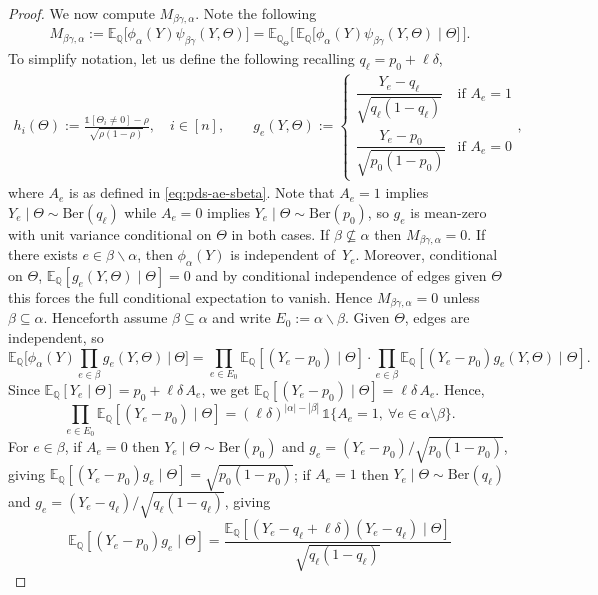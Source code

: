 \documentclass[10pt,a4paper]{amsart}
\newcommand{\E}{\mathbb{E}}
\newcommand{\QQ}{\mathbb{Q}}
\begin{document}
\begin{proof}
\noindent We now compute $M_{\beta\gamma,\alpha}$.
Note the following \begin{align*}
    M_{\beta\gamma,\alpha}
:= \E_{\mathbb Q}\big[\phi_\alpha(Y)\psi_{\beta\gamma}(Y,\Theta)\big]
= \E_{\QQ_\Theta}\Big[\,\E_\QQ\big[\phi_\alpha(Y)\psi_{\beta\gamma}(Y,\Theta)\mid\Theta\big]\,\Big].
\end{align*}
%
To simplify notation, let us define the following recalling $q_\ell=p_0+\ell\delta$, 
\begin{align*}
    h_i(\Theta) := \frac{\mathds 1[\Theta_i\neq 0]-\rho}{\sqrt{\rho(1-\rho)}}, \quad i \in [n], \qquad
    g_e(Y,\Theta):=
\begin{cases}
\dfrac{Y_e-q_\ell}{\sqrt{q_\ell(1-q_\ell)}} & \text{if }A_e=1\\[0.8em]
\dfrac{Y_e-p_0}{\sqrt{p_0(1-p_0)}} & \text{if }A_e=0
\end{cases},
\end{align*}
where $A_e$ is as defined in \eqref{eq:pds-ae-sbeta}. Note that $A_e=1$ implies $Y_e\mid\Theta\sim\mathrm{Ber}(q_\ell)$
while $A_e=0$ implies $Y_e\mid\Theta\sim\mathrm{Ber}(p_0)$,
so $g_e$ is mean-zero with unit variance conditional on $\Theta$ in both cases.
If $\beta\not\subseteq\alpha$ then $M_{\beta\gamma,\alpha}=0$.
If there exists $e\in\beta\backslash\alpha$, then $\phi_\alpha(Y)$ is independent of~$Y_e$.
Moreover, conditional on $\Theta$,
$
\E_{\QQ}[g_e(Y,\Theta)\mid\Theta]=0
$
and by conditional independence
of edges given $\Theta$ this forces the full conditional expectation to vanish. Hence
$M_{\beta\gamma,\alpha}=0$ unless $\beta\subseteq\alpha$. Henceforth assume $\beta\subseteq\alpha$ and write $E_0:=\alpha\backslash\beta$.
\medskip
\noindent Given $\Theta$, edges are independent, so
\[
\E_{\QQ}\Big[\phi_\alpha(Y)\prod_{e\in\beta}g_e(Y,\Theta)\ \Big|\ \Theta\Big]
=
\prod_{e\in E_0}\E_{\QQ}[(Y_e-p_0)\mid\Theta]\cdot
\prod_{e\in \beta}\E_{\QQ}[(Y_e-p_0)g_e(Y,\Theta)\mid\Theta].
\]
Since $\E_{\QQ}[Y_e\mid\Theta]=p_0+\ell\delta\, A_e$, we get $\E_{\QQ}[(Y_e-p_0)\mid\Theta]=\ell\delta\, A_e$. Hence,
\[
\prod_{e\in E_0}\E_{\QQ}[(Y_e-p_0)\mid\Theta]
=(\ell\delta)^{|\alpha|-|\beta|}\,\mathds 1\{A_e=1,\ \forall e\in\alpha\setminus\beta\}.
\]
For $e\in\beta$, if $A_e=0$ then $Y_e\mid\Theta\sim\mathrm{Ber}(p_0)$ and
$g_e=(Y_e-p_0)/\sqrt{p_0(1-p_0)}$, giving
$\E_{\QQ}[(Y_e-p_0)g_e\mid\Theta]=\sqrt{p_0(1-p_0)}$; if $A_e=1$ then
$Y_e\mid\Theta\sim\mathrm{Ber}(q_\ell)$ and $g_e=(Y_e-q_\ell)/\sqrt{q_\ell(1-q_\ell)}$, giving
\[
\E_\QQ[(Y_e-p_0)g_e\mid\Theta]
= \frac{\E_\QQ[(Y_e - q_\ell + \ell\delta)(Y_e - q_\ell)\mid\Theta]}{\sqrt{q_\ell(1-q_\ell)}}
\]
\end{proof}
\end{document}

